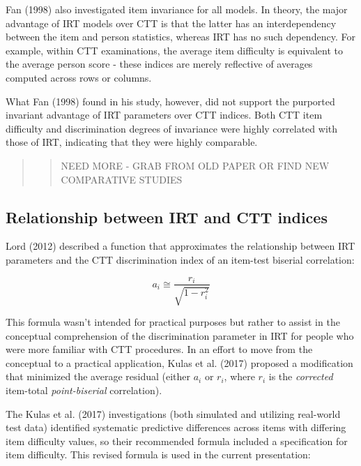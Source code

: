 \documentclass[
  english,
  man]{apa6}
\begin{document}
Fan (1998) also investigated item invariance for all models. In theory, the major advantage of IRT models over CTT is that the latter has an interdependency between the item and person statistics, whereas IRT has no such dependency. For example, within CTT examinations, the average item difficulty is equivalent to the average person score - these indices are merely reflective of averages computed across rows or columns.

What Fan (1998) found in his study, however, did not support the purported invariant advantage of IRT parameters over CTT indices. Both CTT item difficulty and discrimination degrees of invariance were highly correlated with those of IRT, indicating that they were highly comparable.

\begin{quote}
\begin{quote}
NEED MORE - GRAB FROM OLD PAPER OR FIND NEW COMPARATIVE STUDIES
\end{quote}
\end{quote}

\hypertarget{relationship-between-irt-and-ctt-indices}{%
\subsection{Relationship between IRT and CTT indices}\label{relationship-between-irt-and-ctt-indices}}

Lord (2012) described a function that approximates the relationship between IRT parameters and the CTT discrimination index of an item-test biserial correlation:

\[a_i\cong \frac{r_i}{\sqrt{1-r_i^2}}\]

This formula wasn't intended for practical purposes but rather to assist in the conceptual comprehension of the discrimination parameter in IRT for people who were more familiar with CTT procedures. In an effort to move from the conceptual to a practical application, Kulas et al. (2017) proposed a modification that minimized the average residual (either \(a_i\) or \(r_i\), where \(r_i\) is the \emph{corrected} item-total \emph{point-biserial} correlation).

The Kulas et al. (2017) investigations (both simulated and utilizing real-world test data) identified systematic predictive differences across items with differing item difficulty values, so their recommended formula included a specification for item difficulty. This revised formula is used in the current presentation:
\end{document}
